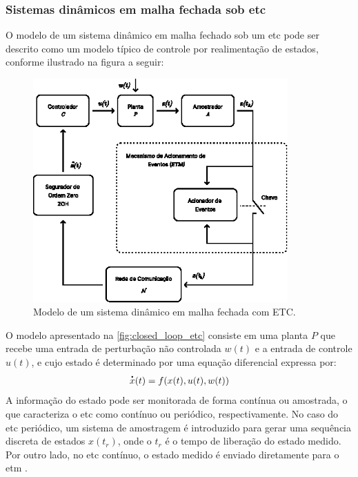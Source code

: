 \subsubsection{Sistemas dinâmicos em malha fechada sob \acrshort{etc}}
O modelo de um sistema dinâmico em malha fechado sob um \acrshort{etc} pode ser descrito como um modelo típico de controle por realimentação de estados, conforme ilustrado na figura a seguir:

\begin{figure}[H]
  \centering
  \includegraphics[width=0.87\textwidth]{figuras/etc-model.eps}
  \caption{Modelo de um sistema dinâmico em malha fechada com ETC.}
  \label{fig:closed_loop_etc}
\end{figure}

O modelo apresentado na \autoref{fig:closed_loop_etc} consiste em uma planta $P$ que recebe uma entrada de perturbação não controlada $w(t)$ e a entrada de controle $u(t)$, e cujo estado é determinado por uma equação diferencial expressa por: \begin{equation}\dt{x}(t) = f(x(t), u(t), w(t))\end{equation} A informação do estado pode ser monitorada de forma contínua ou amostrada, o que caracteriza o \acrshort{etc} como contínuo ou periódico, respectivamente. No caso do \acrshort{etc} periódico, um sistema de amostragem é introduzido para gerar uma sequência discreta de estados $x(t_r)$, onde o $t_r$ é o tempo de liberação do estado medido. Por outro lado, no \acrshort{etc} contínuo, o estado medido é enviado diretamente para o \acrshort{etm} \citep{peng2018,coutinho2021,Lemmon2010}.

